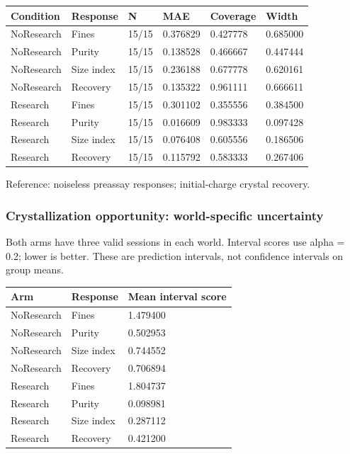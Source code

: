 \documentclass[10pt,a4paper]{article}
\begin{document}
{\def\LTcaptype{table} %
\small\begin{longtable}[]{@{}llllll@{}}
\toprule\noalign{}
Condition & Response & N & MAE & Coverage & Width \\
\midrule\noalign{}
\endhead
\bottomrule\noalign{}
\endlastfoot
NoResearch & Fines & 15/15 & 0.376829 & 0.427778 & 0.685000 \\
NoResearch & Purity & 15/15 & 0.138528 & 0.466667 & 0.447444 \\
NoResearch & Size index & 15/15 & 0.236188 & 0.677778 & 0.620161 \\
NoResearch & Recovery & 15/15 & 0.135322 & 0.961111 & 0.666611 \\
Research & Fines & 15/15 & 0.301102 & 0.355556 & 0.384500 \\
Research & Purity & 15/15 & 0.016609 & 0.983333 & 0.097428 \\
Research & Size index & 15/15 & 0.076408 & 0.605556 & 0.186506 \\
Research & Recovery & 15/15 & 0.115792 & 0.583333 & 0.267406 \\
\end{longtable}\normalsize
}

Reference: noiseless preassay responses; initial-charge crystal recovery.

\subsubsection{Crystallization opportunity: world-specific uncertainty}\label{crystallization-opportunity-world-specific-uncertainty}

Both arms have three valid sessions in each world. Interval scores use alpha = 0.2; lower is better. These are prediction intervals, not confidence intervals on group means.

{\def\LTcaptype{table} %
\small\begin{longtable}[]{@{}lll@{}}
\toprule\noalign{}
Arm & Response & Mean interval score \\
\midrule\noalign{}
\endhead
\bottomrule\noalign{}
\endlastfoot
NoResearch & Fines & 1.479400 \\
NoResearch & Purity & 0.502953 \\
NoResearch & Size index & 0.744552 \\
NoResearch & Recovery & 0.706894 \\
Research & Fines & 1.804737 \\
Research & Purity & 0.098981 \\
Research & Size index & 0.287112 \\
Research & Recovery & 0.421200 \\
\end{longtable}\normalsize
}
\end{document}
